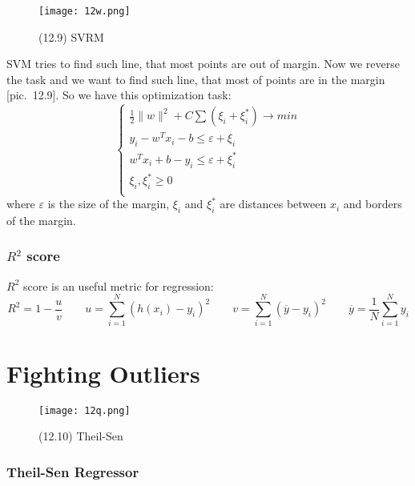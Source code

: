 \begin{wrapfigure}{r}{0.4\linewidth}
	\vspace{-1cm}
  \begin{center}
    \texttt{[image: 12w.png]}
  \end{center}
  \vspace{-0.6cm}
  \caption*{(12.9) SVRM}
  \vspace{-1cm}
\end{wrapfigure}
SVM tries to find such line, that most points are out of margin. Now we reverse the task and we want to find such line, that most of points are in the margin [pic.~12.9]. So we have this optimization task:
$$\begin{cases}
	\frac{1}{2}\|w\|^2+C\sum(\xi_i+\xi_i^*)\to min \\
	y_i-w^Tx_i-b\le\varepsilon+\xi_i \\
	w^Tx_i+b-y_i\le\varepsilon+\xi_i^* \\
	\xi_i,\xi_i^* \ge 0 \\
\end{cases}$$
where $\varepsilon$ is the size of the margin, $\xi_i$ and $\xi_i^*$ are distances between $x_i$ and borders of the margin.

\subsubsection*{$R^2$ score}

$R^2$ score is an useful metric for regression:
$$R^2=1-\frac{u}{v}\qquad u=\sum\limits_{i=1}^{N}(h(x_i)-y_i)^2\qquad v=\sum\limits_{i=1}^{N}(\overline{y}-y_i)^2\qquad \overline{y}=\frac{1}{N}\sum\limits_{i=1}^{N}y_i$$

\section{Fighting Outliers}
\vspace{-0.6cm}

\begin{wrapfigure}{r}{0.26\linewidth}
	\vspace{-2.7cm}
  \begin{center}
    \texttt{[image: 12q.png]}
  \end{center}
  \vspace{-0.6cm}
  \caption*{(12.10) Theil-Sen}
\end{wrapfigure}

\subsubsection*{Theil-Sen Regressor}

